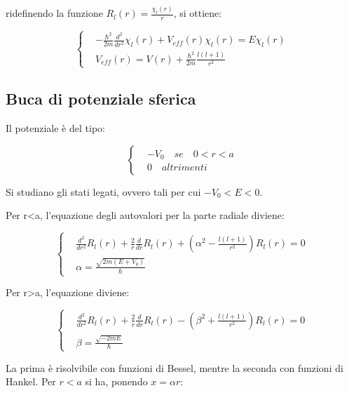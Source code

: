 \documentclass{article}
\begin{document}
ridefinendo la funzione $R_l(r)=\frac{\chi_l(r)}{r}$, si ottiene:

\begin{equation}
    \left\{
    \begin{aligned}
         & -\frac{\hbar^2}{2m}\frac{d^2}{dr^2}\chi_l(r)+V_{eff}(r)\chi_l(r)=E\chi_l(r) \\
         & V_{eff}(r)=V(r)+\frac{\hbar^2}{2m}\frac{l(l+1)}{r^2}
    \end{aligned}
    \right.
\end{equation}

\subsection{Buca di potenziale sferica}
Il potenziale è del tipo:

\begin{equation}
    \left\{
    \begin{aligned}
         & -V_0 \quad se \quad 0<r<a \\
         & 0 \quad altrimenti
    \end{aligned}
    \right.
\end{equation}

Si studiano gli stati legati, ovvero tali per cui $-V_0<E<0$.

Per r<a, l'equazione degli autovalori per la parte radiale diviene:

\begin{equation}
    \left\{
    \begin{aligned}
         & \frac{d^2}{dr^2}R_l(r)+\frac{2}{r}\frac{d}{dr}R_l(r)+\left(\alpha^2-\frac{l(l+1)}{r^2}\right)R_l(r)=0 \\
         & \alpha=\frac{\sqrt{2m(E+V_0)}}{\hbar}
    \end{aligned}
    \right.
\end{equation}

Per r>a, l'equazione diviene:

\begin{equation}
    \left\{
    \begin{aligned}
         & \frac{d^2}{dr^2}R_l(r)+\frac{2}{r}\frac{d}{dr}R_l(r)-\left(\beta^2+\frac{l(l+1)}{r^2}\right)R_l(r)=0 \\
         & \beta=\frac{\sqrt{-2mE}}{\hbar}
    \end{aligned}
    \right.
\end{equation}


La prima è risolvibile con funzioni di Bessel, mentre la seconda con funzioni di Hankel.
Per $r<a$ si ha, ponendo $x=\alpha r$:
\end{document}
